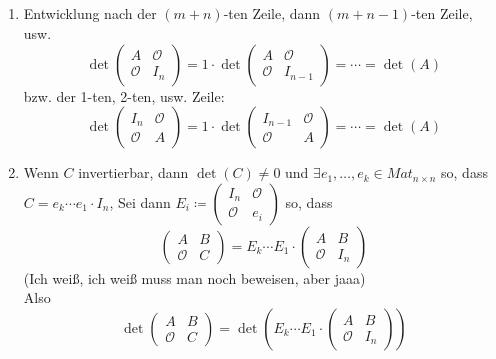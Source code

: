 \documentclass[sectionformat = aufgabe]{gadsescript}
\begin{document}
\subsection{}
\begin{enumerate}[label=(\alph*)]
	\item Entwicklung nach der $ (m + n) $-ten Zeile, dann $ (m + n - 1) $-ten Zeile, usw.
		\[
			\det \begin{pmatrix} A & \mathcal{O} \\ \mathcal{O} & I_n \end{pmatrix} = 1 \cdot \det \begin{pmatrix} A & \mathcal{O} \\ \mathcal{O} & I_{n - 1}  \end{pmatrix} = \dotsb = \det(A)
		\]
		bzw. der 1-ten, 2-ten, usw. Zeile:
		\[
			\det \begin{pmatrix} I_n & \mathcal{O} \\ \mathcal{O} & A \end{pmatrix} = 1 \cdot \det \begin{pmatrix} I_{n - 1}  & \mathcal{O} \\ \mathcal{O} & A  \end{pmatrix} = \dotsb = \det(A)
		\]
	\item Wenn $ C $ invertierbar, dann $ \det(C) \neq 0 $ und $ \exists e_1, \dotsc, e_k \in Mat_{n \times n}  $ so, dass $ C = e_k \dotsb e_1 \cdot I_n $,
		Sei dann $ E_i \coloneqq \begin{pmatrix} I_n  & \mathcal{O} \\ \mathcal{O} & e_i \end{pmatrix}  $ so, dass
		\[
			\begin{pmatrix} A & B \\ \mathcal{O} & C \end{pmatrix} = E_k \dotsb E_1 \cdot \begin{pmatrix} A & B \\ \mathcal{O} & I_n \end{pmatrix} 
		\]
		(Ich weiß, ich weiß muss man noch beweisen, aber jaaa)\\
		Also
		\[
			\det 
			\begin{pmatrix} A & B \\ \mathcal{O} & C \end{pmatrix}
			= \det \left( E_k \dotsb E_1 \cdot \begin{pmatrix} A & B \\ \mathcal{O} & I_n \end{pmatrix} \right)
\]
\end{enumerate}
\end{document}
